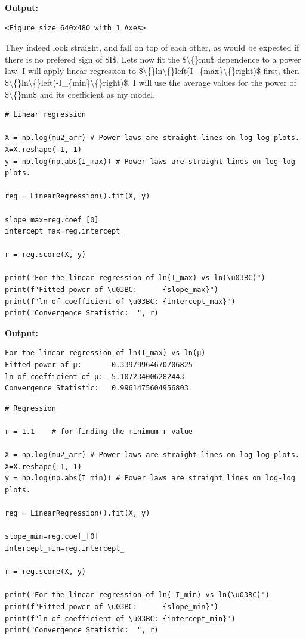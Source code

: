 \documentclass{article}
\begin{document}
\textbf{Output:}\begin{verbatim}
<Figure size 640x480 with 1 Axes>
\end{verbatim}

They indeed look straight, and fall on top of each other, as would be expected if there is no prefered sign of \$I\$. Lets now fit the \$\textbackslash\{\}mu\$ dependence to a power law. I will apply linear regression to \$\textbackslash\{\}ln\textbackslash\{\}left(I\_\{max\}\textbackslash\{\}right)\$ first, then \$\textbackslash\{\}ln\textbackslash\{\}left(-I\_\{min\}\textbackslash\{\}right)\$. I will use the average values for the power of \$\textbackslash\{\}mu\$ and its coefficient as my model.

\begin{lstlisting}
# Linear regression

X = np.log(mu2_arr) # Power laws are straight lines on log-log plots.
X=X.reshape(-1, 1)
y = np.log(np.abs(I_max)) # Power laws are straight lines on log-log plots.

reg = LinearRegression().fit(X, y)

slope_max=reg.coef_[0]
intercept_max=reg.intercept_

r = reg.score(X, y)

print("For the linear regression of ln(I_max) vs ln(\u03BC)")
print(f"Fitted power of \u03BC:      {slope_max}")
print(f"ln of coefficient of \u03BC: {intercept_max}")
print("Convergence Statistic:  ", r) \end{lstlisting}

\textbf{Output:}\begin{verbatim}
For the linear regression of ln(I_max) vs ln(μ)
Fitted power of μ:      -0.33979964670706825
ln of coefficient of μ: -5.107234006282443
Convergence Statistic:   0.9961475604956803

\end{verbatim}

\begin{lstlisting}
# Regression

r = 1.1    # for finding the minimum r value

X = np.log(mu2_arr) # Power laws are straight lines on log-log plots.
X=X.reshape(-1, 1)
y = np.log(np.abs(I_min)) # Power laws are straight lines on log-log plots.

reg = LinearRegression().fit(X, y)

slope_min=reg.coef_[0]
intercept_min=reg.intercept_

r = reg.score(X, y)

print("For the linear regression of ln(-I_min) vs ln(\u03BC)")
print(f"Fitted power of \u03BC:      {slope_min}")
print(f"ln of coefficient of \u03BC: {intercept_min}")
print("Convergence Statistic:  ", r) \end{lstlisting}
\end{document}
